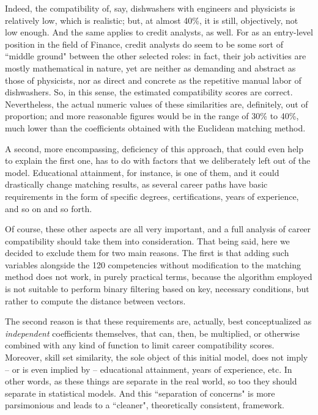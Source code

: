 \documentclass{article}
\begin{document}
Indeed, the compatibility of, say, dishwashers with engineers and physicists is
relatively low, which is realistic; but, at almost 40\%, it is still,
objectively, not low enough. And the same applies to credit analysts, as well.
For as an entry-level position in the field of Finance, credit analysts do seem
to be some sort of ``middle ground" between the other selected roles: in fact,
their job activities are mostly mathematical in nature, yet are neither as
demanding and abstract as those of physicists, nor as direct and concrete as
the repetitive manual labor of dishwashers. So, in this sense, the estimated
compatibility scores are correct. Nevertheless, the actual numeric values of
these similarities are, definitely, out of proportion; and more reasonable
figures would be in the range of 30\% to 40\%, much lower than the coefficients
obtained with the Euclidean matching method.

A second, more encompassing, deficiency of this approach, that could even help
to explain the first one, has to do with factors that we deliberately left out
of the model. Educational attainment, for instance, is one of them, and it
could drastically change matching results, as several career paths have basic
requirements in the form of specific degrees, certifications, years of
experience, and so on and so forth.

Of course, these other aspects are all very important, and a full analysis of
career compatibility should take them into consideration. That being said, here
we decided to exclude them for two main reasons. The first is that adding such
variables alongside the 120 competencies without modification to the matching
method does not work, in purely practical terms, because the algorithm employed
is not suitable to perform binary filtering based on key, necessary conditions,
but rather to compute the distance between vectors.

The second reason is that these requirements are, actually, best conceptualized
as \textit{independent} coefficients themselves, that can, then, be multiplied,
or otherwise combined with any kind of function to limit career compatibility
scores. Moreover, skill set similarity, the sole object of this initial model,
does not imply -- or is even implied by -- educational attainment, years of
experience, etc. In other words, as these things are separate in the real
world, so too they should separate in statistical models. And this ``separation
of concerns" is more parsimonious and leads to a ``cleaner", theoretically
consistent, framework.
\end{document}
